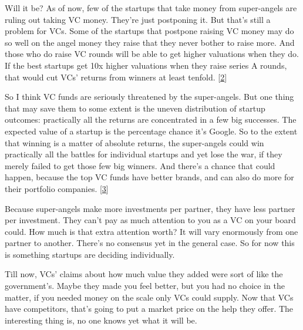 Will it be?
                    As of now, few of the startups that take money from
                    super-angels are ruling out taking VC money. They're just
                    postponing it. But that's still a problem for VCs. Some of
                    the startups that postpone raising VC money may do so well
                    on the angel money they raise that they never bother to
                    raise more. And those who do raise VC rounds will be able to
                    get higher valuations when they do. If the best startups get
                    10x higher valuations when they raise series A rounds, that
                    would cut VCs' returns from winners at least tenfold.
                    [\href{\#f2n}{2}]

So I think VC funds are seriously threatened by
                    the super-angels. But one thing that may save them to some
                    extent is the uneven distribution of startup outcomes:
                    practically all the returns are concentrated in a few big
                    successes. The expected value of a startup is the percentage
                    chance it's Google. So to the extent that winning is a
                    matter of absolute returns, the super-angels could win
                    practically all the battles for individual startups and yet
                    lose the war, if they merely failed to get those few big
                    winners. And there's a chance that could happen, because the
                    top VC funds have better brands, and can also do more for
                    their portfolio companies.
                    [\href{\#f3n}{3}]

Because super-angels make more investments per
                    partner, they have less partner per investment. They can't
                    pay as much attention to you as a VC on your board could.
                    How much is that extra attention worth? It will vary
                    enormously from one partner to another. There's no consensus
                    yet in the general case. So for now this is something
                    startups are deciding individually.

Till now,
                    VCs' claims about how much value they added were sort of
                    like the government's. Maybe they made you feel better, but
                    you had no choice in the matter, if you needed money on the
                    scale only VCs could supply. Now that VCs have competitors,
                    that's going to put a market price on the help they offer.
                    The interesting thing is, no one knows yet what it will
                    be.

